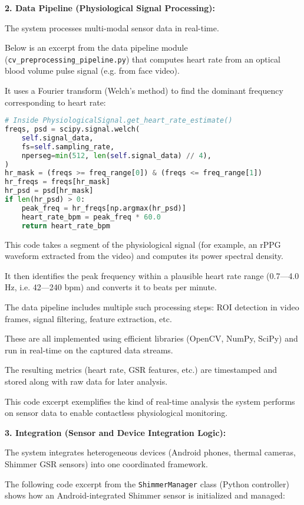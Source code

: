 {{{\textbf{2. Data Pipeline (Physiological Signal Processing):}

The system processes multi-modal sensor data in real-time.

Below is an excerpt from the data pipeline module
(\texttt{cv\_preprocessing\_pipeline.py}) that computes heart rate from an optical
blood volume pulse signal (e.g.  from face video).

It uses a Fourier transform (Welch's method) to find the dominant frequency
corresponding to heart rate:

\begin{lstlisting}[language=Python]
# Inside PhysiologicalSignal.get_heart_rate_estimate()
freqs, psd = scipy.signal.welch(
    self.signal_data,
    fs=self.sampling_rate,
    nperseg=min(512, len(self.signal_data) // 4),
)
hr_mask = (freqs >= freq_range[0]) & (freqs <= freq_range[1])
hr_freqs = freqs[hr_mask]
hr_psd = psd[hr_mask]
if len(hr_psd) > 0:
    peak_freq = hr_freqs[np.argmax(hr_psd)]
    heart_rate_bpm = peak_freq * 60.0
    return heart_rate_bpm
\end{lstlisting}

This code takes a segment of the physiological signal (for example, an rPPG waveform 
extracted from the video) and computes its power spectral density.

It then identifies the peak frequency within a plausible heart rate range (0.7---4.0
Hz, i.e.  42---240 bpm) and converts it to beats per minute.

The data pipeline includes multiple such processing steps: ROI detection in video
frames, signal filtering, feature extraction, etc.

These are all implemented using efficient libraries (OpenCV, NumPy, SciPy) and run in
real-time on the captured data streams.

The resulting metrics (heart rate, GSR features, etc.) are timestamped and stored
along with raw data for later analysis.

This code excerpt exemplifies the kind of real-time analysis the system performs on
sensor data to enable contactless physiological monitoring.

\textbf{3. Integration (Sensor and Device Integration Logic):}

The system integrates heterogeneous devices (Android phones, thermal cameras, Shimmer
GSR sensors) into one coordinated framework.

The following code excerpt from the \texttt{ShimmerManager} class (Python controller)
shows how an Android-integrated Shimmer sensor is initialized and managed:

}}}
